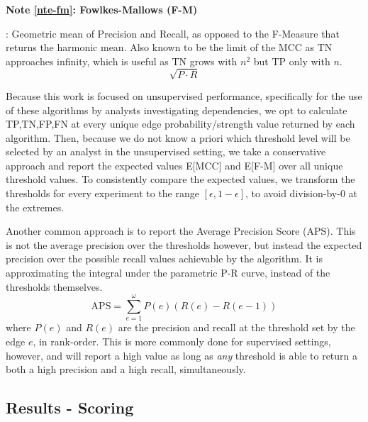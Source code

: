 \documentclass[%
	12pt,
		oneside,
		letterpaper
]{book}
\newcounter{quartocalloutnteno}
\newcommand{\quartocalloutnte}[1]{\refstepcounter{quartocalloutnteno}\label{#1}}
\begin{document}
\begin{tcolorbox}[enhanced jigsaw, opacityback=0, colback=white, breakable, rightrule=.15mm, leftrule=.75mm, arc=.35mm, colframe=quarto-callout-note-color-frame, bottomrule=.15mm, toprule=.15mm, left=2mm]

\quartocalloutnte{nte-fm} 

\vspace{-3mm}\textbf{Note \ref*{nte-fm}: Fowlkes-Mallows (F-M)}\vspace{3mm}

: Geometric mean of Precision and Recall, as opposed to the F-Measure
that returns the harmonic mean. Also known to be the limit of the MCC as
TN approaches infinity\autocite{MCCapproachesgeometric_Crall2023}, which
is useful as TN grows with \(n^2\) but TP only with \(n\).
\[\sqrt{P\cdot R}\]

\end{tcolorbox}

Because this work is focused on unsupervised performance, specifically
for the use of these algorithms by analysts investigating dependencies,
we opt to calculate TP,TN,FP,FN at every unique edge
probability/strength value returned by each algorithm. Then, because we
do not know a priori which threshold level will be selected by an
analyst in the unsupervised setting, we take a conservative approach and
report the expected values E{[}MCC{]} and E{[}F-M{]} over all unique
threshold values. To consistently compare the expected values, we
transform the thresholds for every experiment to the range
\([\epsilon, 1-\epsilon]\), to avoid division-by-0 at the extremes.

Another common approach is to report the Average Precision Score (APS).
This is not the average precision over the thresholds however, but
instead the expected precision over the possible recall values
achievable by the algorithm. It is approximating the integral under the
parametric P-R curve, instead of the thresholds themselves.
\[\text{APS} = \sum_{e=1}^{\omega} P(e)(R(e)-R(e-1))\] where \(P(e)\)
and \(R(e)\) are the precision and recall at the threshold set by the
edge \(e\), in rank-order. This is more commonly done for supervised
settings, however, and will report a high value as long as \emph{any}
threshold is able to return a both a high precision and a high recall,
simultaneously.

\subsection{Results - Scoring}\label{results---scoring}
\end{document}
